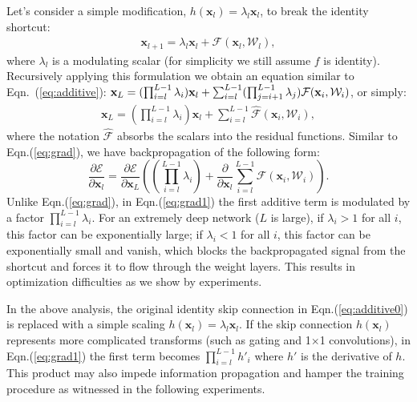 \documentclass[runningheads]{llncs}
\newcommand{\ve}[1]{\mathbf{#1}} %
\newcommand{\fp}[2]{\frac{\partial{#1}}{\partial{#2}}} %
\newcommand{\dvp}[2]{\frac{\partial}{\partial{#2}}#1} %
\begin{document}
Let's consider a simple modification, $h(\ve{x}_{l}) = \lambda_l\ve{x}_{l}$, to break the identity shortcut:
\begin{eqnarray}
\ve{x}_{l+1} = \lambda_l\ve{x}_{l} + \mathcal{F}(\ve{x}_{l}, \mathcal{W}_{l}),
\end{eqnarray}
where $\lambda_l$ is a modulating scalar (for simplicity we still assume $f$ is identity). Recursively applying this formulation we obtain an equation similar to Eqn.~(\ref{eq:additive}): $\ve{x}_{L} =  (\prod_{i=l}^{L-1}\lambda_{i})\ve{x}_{l} + \sum_{i=l}^{L-1} (\prod_{j=i+1}^{L-1}\lambda_{\tiny j}) \mathcal{F}(\ve{x}_{i}, \mathcal{W}_{i})$, or simply:
\begin{eqnarray}
\ve{x}_{L} = (\prod_{i=l}^{L-1}\lambda_{i})\ve{x}_{l} + \sum_{i=l}^{L-1}\mathcal{\hat{F}}(\ve{x}_{i}, \mathcal{W}_{i}),
\label{eq:additive1}
\end{eqnarray}
where the notation $\mathcal{\hat{F}}$ absorbs the scalars into the residual functions.
Similar to Eqn.(\ref{eq:grad}), we have backpropagation of the following form:
\begin{equation}
\fp{\mathcal{E}}{\ve{x}_{l}}=\fp{\mathcal{E}}{\ve{x}_{L}}\left((\prod_{i=l}^{L-1}\lambda_{i})+\dvp{\sum_{i=l}^{L-1}\mathcal{\hat{F}}(\ve{x}_{i}, \mathcal{W}_{i})}{\ve{x}_{l}}\right).\label{eq:grad1}
\end{equation}
Unlike Eqn.(\ref{eq:grad}), in Eqn.(\ref{eq:grad1}) the first additive term is modulated by a factor $\prod_{i=l}^{L-1}\lambda_{i}$. For an extremely deep network ($L$ is large), if $\lambda_{i}>1$ for all $i$, this factor can be exponentially large; if $\lambda_{i}<1$ for all $i$, this factor can be exponentially small and vanish, which blocks the backpropagated signal from the shortcut and forces it to flow through the weight layers. This results in optimization difficulties as we show by experiments.

In the above analysis, the original identity skip connection in Eqn.(\ref{eq:additive0}) is replaced with a simple scaling $h(\ve{x}_{l}) = \lambda_l\ve{x}_{l}$. If the skip connection $h(\ve{x}_{l})$ represents more complicated transforms (such as gating and 1$\times$1 convolutions), in Eqn.(\ref{eq:grad1}) the first term becomes $\prod_{i=l}^{L-1}h'_{i}$ where $h'$ is the derivative of $h$. This product may also impede information propagation and hamper the training procedure as witnessed in the following experiments.
\end{document}
